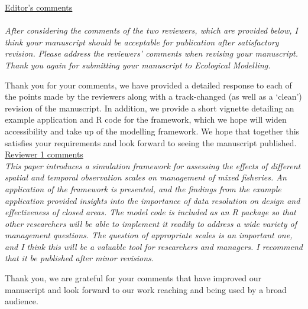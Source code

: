 \documentclass[10pt]{letter}
\begin{document}
\underline{Editor's comments} \\
\\
\textit{
After considering the comments of the two reviewers, which are provided below,
I think your manuscript should be acceptable for publication after satisfactory
revision.  Please address the reviewers' comments when revising your
manuscript. Thank you again for submitting your manuscript to Ecological
Modelling.
} 

Thank you for your comments, we have provided a detailed response to each of
the points made by the reviewers along with a track-changed (as well as a
`clean') revision of the manuscript. In addition, we provide a short vignette
detailing an example application and R code for the framework, which we hope
will widen accessibility and take up of the modelling framework. We hope that
together this satisfies your requirements and look forward to seeing the
manuscript published. \\


\underline{Reviewer 1 comments} \\

\textit{This paper introduces a simulation framework for assessing the effects
	of different spatial and temporal observation scales on management of
	mixed fisheries. An application of the framework is presented, and the
	findings from the example application provided insights into the
	importance of data resolution on design and effectiveness of closed
	areas. The model code is included as an R package so that other
	researchers will be able to implement it readily to address a wide
	variety of management questions. The question of appropriate scales is
	an important one, and I think this will be a valuable tool for
	researchers and managers. I recommend that it be published after minor
	revisions.} 

Thank you, we are grateful for your comments that have improved our manuscript
and look forward to our work reaching and being used by a broad audience. 
\end{document}
